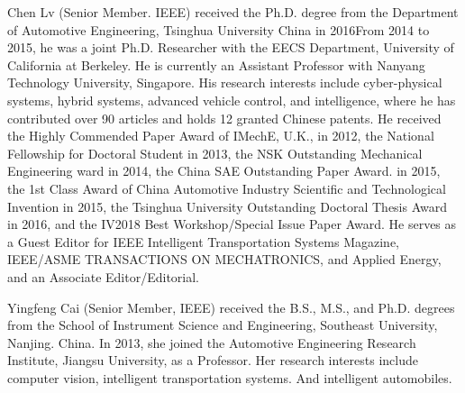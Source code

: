     \begin{IEEEbiography}{Chen Lv}
        (Senior Member. IEEE) received the Ph.D. degree from the Department of Automotive Engineering, Tsinghua University China in 2016From 2014 to 2015, he was a joint Ph.D. Researcher with the EECS Department, University of California at Berkeley. He is currently an Assistant Professor with Nanyang Technology University, Singapore. His research interests include cyber-physical systems, hybrid systems, advanced vehicle control, and intelligence, where he has contributed over 90 articles and holds 12 granted Chinese patents. He received the Highly Commended Paper Award of IMechE, U.K., in 2012, the National Fellowship for Doctoral Student in 2013, the NSK Outstanding Mechanical Engineering ward in 2014, the China SAE Outstanding Paper Award. in 2015, the 1st Class Award of China Automotive Industry Scientific and Technological Invention in 2015, the Tsinghua University Outstanding Doctoral Thesis Award in 2016, and the IV2018 Best Workshop/Special Issue Paper Award. He serves as a Guest Editor for IEEE Intelligent Transportation Systems Magazine, IEEE/ASME TRANSACTIONS ON MECHATRONICS, and Applied Energy, and an Associate Editor/Editorial.
    \end{IEEEbiography} 
    \begin{IEEEbiography}{Yingfeng Cai}
        (Senior Member, IEEE) received the B.S., M.S., and Ph.D. degrees from the School of Instrument Science and Engineering, Southeast University, Nanjing. China. In 2013, she joined the Automotive Engineering Research Institute, Jiangsu University, as a Professor. Her research interests include computer vision, intelligent transportation systems. And intelligent automobiles.
    \end{IEEEbiography}
    

